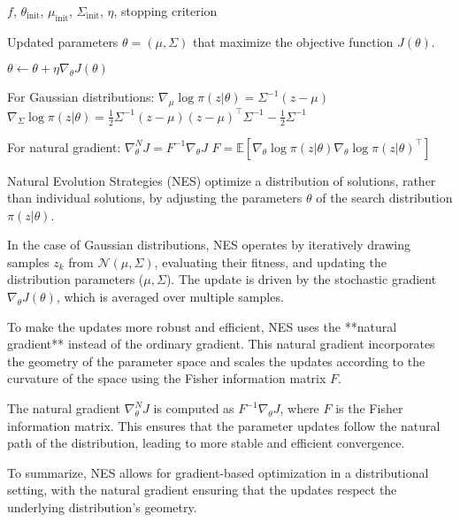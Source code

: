 $f$, $\theta_{\text{init}}$, $\mu_{\text{init}}$, $\Sigma_{\text{init}}$, $\eta$, stopping criterion

Updated parameters $\theta = (\mu, \Sigma)$ that maximize the objective function $J(\theta)$.

$\theta \leftarrow \theta + \eta \nabla_\theta J(\theta)$

For Gaussian distributions:
$\nabla_\mu \log \pi (z | \theta) = \Sigma^{-1} (z - \mu)$
$\nabla_\Sigma \log \pi (z | \theta) = \frac{1}{2} \Sigma^{-1} (z - \mu) (z - \mu)^\top \Sigma^{-1} - \frac{1}{2} \Sigma^{-1}$

For natural gradient:
$\nabla_\theta^N J = F^{-1} \nabla_\theta J$
$F = \mathbb{E} \left[ \nabla_\theta \log \pi (z|\theta) \nabla_\theta \log \pi (z|\theta)^\top \right]$

Natural Evolution Strategies (NES) optimize a distribution of solutions, rather than individual solutions, by adjusting the parameters $\theta$ of the search distribution $\pi(z|\theta)$. 

In the case of Gaussian distributions, NES operates by iteratively drawing samples $z_k$ from $\mathcal{N}(\mu, \Sigma)$, evaluating their fitness, and updating the distribution parameters ($\mu, \Sigma$). The update is driven by the stochastic gradient $\nabla_\theta J(\theta)$, which is averaged over multiple samples.

To make the updates more robust and efficient, NES uses the **natural gradient** instead of the ordinary gradient. This natural gradient incorporates the geometry of the parameter space and scales the updates according to the curvature of the space using the Fisher information matrix $F$.

The natural gradient $\nabla_\theta^N J$ is computed as $F^{-1} \nabla_\theta J$, where $F$ is the Fisher information matrix. This ensures that the parameter updates follow the natural path of the distribution, leading to more stable and efficient convergence.

To summarize, NES allows for gradient-based optimization in a distributional setting, with the natural gradient ensuring that the updates respect the underlying distribution's geometry.
